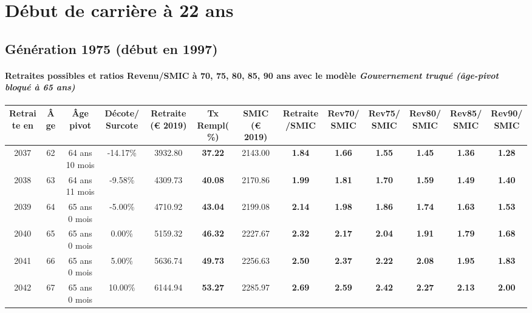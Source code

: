  \addto{\captionsenglish}{ \renewcommand{\mtctitle}{}} \setcounter{minitocdepth}{2} 
 \minitoc \newpage 

\section{Début de carrière à 22 ans} 

\subsection{Génération 1975 (début en 1997)} 

\paragraph{Retraites possibles et ratios Revenu/SMIC à 70, 75, 80, 85, 90 ans avec le modèle \emph{Gouvernement truqué (âge-pivot bloqué à 65 ans)}}  
 
{ \scriptsize \begin{center} 
\begin{tabular}[htb]{|c|c||c|c||c|c||c||c|c|c|c|c|c|} 
\hline 
 Retraite en &  Âge &  Âge pivot &  Décote/Surcote &  Retraite (\euro{} 2019) &  Tx Rempl(\%) &  SMIC (\euro{} 2019) &  Retraite/SMIC &  Rev70/SMIC &  Rev75/SMIC &  Rev80/SMIC &  Rev85/SMIC &  Rev90/SMIC \\ 
\hline \hline 
 2037 &  62 &  64 ans 10 mois &  -14.17\% &  3932.80 &  {\bf 37.22} &  2143.00 &  {\bf 1.84} &  {\bf 1.66} &  {\bf 1.55} &  {\bf 1.45} &  {\bf 1.36} &  {\bf 1.28} \\ 
\hline 
 2038 &  63 &  64 ans 11 mois &  -9.58\% &  4309.73 &  {\bf 40.08} &  2170.86 &  {\bf 1.99} &  {\bf 1.81} &  {\bf 1.70} &  {\bf 1.59} &  {\bf 1.49} &  {\bf 1.40} \\ 
\hline 
 2039 &  64 &  65 ans 0 mois &  -5.00\% &  4710.92 &  {\bf 43.04} &  2199.08 &  {\bf 2.14} &  {\bf 1.98} &  {\bf 1.86} &  {\bf 1.74} &  {\bf 1.63} &  {\bf 1.53} \\ 
\hline 
 2040 &  65 &  65 ans 0 mois &  0.00\% &  5159.32 &  {\bf 46.32} &  2227.67 &  {\bf 2.32} &  {\bf 2.17} &  {\bf 2.04} &  {\bf 1.91} &  {\bf 1.79} &  {\bf 1.68} \\ 
\hline 
 2041 &  66 &  65 ans 0 mois &  5.00\% &  5636.74 &  {\bf 49.73} &  2256.63 &  {\bf 2.50} &  {\bf 2.37} &  {\bf 2.22} &  {\bf 2.08} &  {\bf 1.95} &  {\bf 1.83} \\ 
\hline 
 2042 &  67 &  65 ans 0 mois &  10.00\% &  6144.94 &  {\bf 53.27} &  2285.97 &  {\bf 2.69} &  {\bf 2.59} &  {\bf 2.42} &  {\bf 2.27} &  {\bf 2.13} &  {\bf 2.00} \\ 
\hline 
\hline 
\end{tabular} 
\end{center} } 

